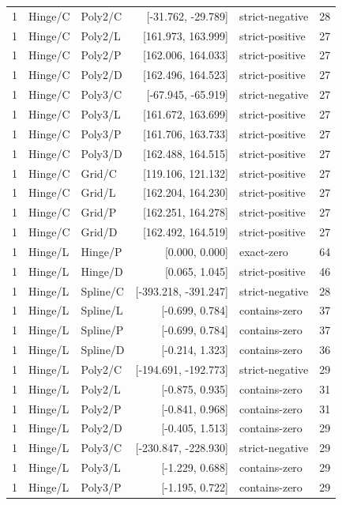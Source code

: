 \begin{longtable}{lllrlr}
1 & Hinge/C & Poly2/C & [-31.762, -29.789] & strict-negative & 28 \\
1 & Hinge/C & Poly2/L & [161.973, 163.999] & strict-positive & 27 \\
1 & Hinge/C & Poly2/P & [162.006, 164.033] & strict-positive & 27 \\
1 & Hinge/C & Poly2/D & [162.496, 164.523] & strict-positive & 27 \\
1 & Hinge/C & Poly3/C & [-67.945, -65.919] & strict-negative & 27 \\
1 & Hinge/C & Poly3/L & [161.672, 163.699] & strict-positive & 27 \\
1 & Hinge/C & Poly3/P & [161.706, 163.733] & strict-positive & 27 \\
1 & Hinge/C & Poly3/D & [162.488, 164.515] & strict-positive & 27 \\
1 & Hinge/C & Grid/C & [119.106, 121.132] & strict-positive & 27 \\
1 & Hinge/C & Grid/L & [162.204, 164.230] & strict-positive & 27 \\
1 & Hinge/C & Grid/P & [162.251, 164.278] & strict-positive & 27 \\
1 & Hinge/C & Grid/D & [162.492, 164.519] & strict-positive & 27 \\
1 & Hinge/L & Hinge/P & [0.000, 0.000] & exact-zero & 64 \\
1 & Hinge/L & Hinge/D & [0.065, 1.045] & strict-positive & 46 \\
1 & Hinge/L & Spline/C & [-393.218, -391.247] & strict-negative & 28 \\
1 & Hinge/L & Spline/L & [-0.699, 0.784] & contains-zero & 37 \\
1 & Hinge/L & Spline/P & [-0.699, 0.784] & contains-zero & 37 \\
1 & Hinge/L & Spline/D & [-0.214, 1.323] & contains-zero & 36 \\
1 & Hinge/L & Poly2/C & [-194.691, -192.773] & strict-negative & 29 \\
1 & Hinge/L & Poly2/L & [-0.875, 0.935] & contains-zero & 31 \\
1 & Hinge/L & Poly2/P & [-0.841, 0.968] & contains-zero & 31 \\
1 & Hinge/L & Poly2/D & [-0.405, 1.513] & contains-zero & 29 \\
1 & Hinge/L & Poly3/C & [-230.847, -228.930] & strict-negative & 29 \\
1 & Hinge/L & Poly3/L & [-1.229, 0.688] & contains-zero & 29 \\
1 & Hinge/L & Poly3/P & [-1.195, 0.722] & contains-zero & 29 \\

\end{longtable}
